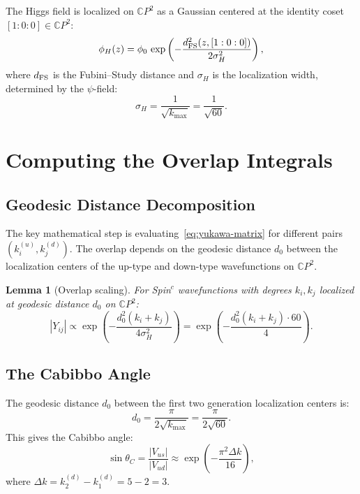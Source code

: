 \documentclass[11pt,a4paper]{article}
\newtheorem{lemma}[theorem]{Lemma}
\theoremstyle{remark}
\newcommand{\CP}{\mathbb{C}P}
\begin{document}
The Higgs field is localized on $\CP^2$ as a Gaussian centered at the
identity coset $[1:0:0] \in \CP^2$:
\begin{equation}
\phi_H(z) = \phi_0\,\exp\left(-\frac{d_{\rm FS}^2(z, [1:0:0])}{2\sigma_H^2}\right),
\label{eq:higgs-profile}
\end{equation}
where $d_{\rm FS}$ is the Fubini--Study distance and $\sigma_H$ is the
localization width, determined by the $\psi$-field:
\begin{equation}
\sigma_H = \frac{1}{\sqrt{k_{\max}}} = \frac{1}{\sqrt{60}}.
\end{equation}

\section{Computing the Overlap Integrals}

\subsection{Geodesic Distance Decomposition}

The key mathematical step is evaluating~\eqref{eq:yukawa-matrix} for
different pairs $(k_i^{(u)}, k_j^{(d)})$. The overlap depends on the
geodesic distance $d_0$ between the localization centers of the up-type
and down-type wavefunctions on $\CP^2$.

\begin{lemma}[Overlap scaling]
\label{lem:overlap}
For Spin$^c$ wavefunctions with degrees $k_i, k_j$ localized at
geodesic distance $d_0$ on $\CP^2$:
\begin{equation}
|Y_{ij}| \propto \exp\left(-\frac{d_0^2(k_i + k_j)}{4\sigma_H^2}\right)
= \exp\left(-\frac{d_0^2(k_i + k_j) \cdot 60}{4}\right).
\end{equation}
\end{lemma}

\subsection{The Cabibbo Angle}

The geodesic distance $d_0$ between the first two generation localization
centers is:
\begin{equation}
d_0 = \frac{\pi}{2\sqrt{k_{\max}}} = \frac{\pi}{2\sqrt{60}}.
\end{equation}
This gives the Cabibbo angle:
\begin{equation}
\sin\theta_C = \frac{|V_{us}|}{|V_{ud}|} \approx \exp\left(-\frac{\pi^2 \Delta k}{16}\right),
\end{equation}
where $\Delta k = k_2^{(d)} - k_1^{(d)} = 5 - 2 = 3$.
\end{document}
